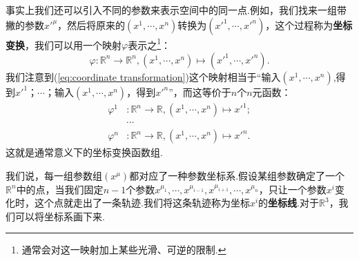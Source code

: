 	事实上我们还可以引入不同的参数来表示空间中的同一点.例如，我们找来一组带撇的参数$x'^\mu$，然后将原来的$(x^1,\cdots,x^n)$转换为$(x'^1,\cdots,x'^n)$，这个过程称为\textbf{坐标变换}，我们可以用一个映射$\varphi$表示之\footnote{通常会对这一映射加上某些光滑、可逆的限制.}：
	\begin{equation}\label{eq:coordinate transformation}
		\varphi:\mathbb{R}^n\rightarrow \mathbb{R}^n,(x^1,\cdots,x^n)\mapsto (x'^1,\cdots,x'^n).
	\end{equation}
	我们注意到(\ref{eq:coordinate transformation})这个映射相当于“输入$(x^1,\cdots,x^n)$,得到$x'^1$；$\cdots$；输入$(x^1,\cdots,x^n)$，得到$x'^n$”，而这等价于$n$个$n$元函数：
	\begin{equation}
		\begin{split}
			\varphi^1&:\mathbb{R}^n\rightarrow \mathbb{R},(x^1,\cdots,x^n)\mapsto x'^1;\\
			&\cdots\\
			\varphi^n&:\mathbb{R}^n\rightarrow \mathbb{R},(x^1,\cdots,x^n)\mapsto x'^n.
		\end{split}
	\end{equation}
	这就是通常意义下的坐标变换函数组.
			
	我们说，每一组参数组$(x^\mu)$都对应了一种参数坐标系.假设某组参数确定了一个$\mathbb{R}^n$中的点，当我们固定$n-1$个参数$x^{\mu_1},\cdots,x^{\mu_{i-1}},x^{\mu_{i+1}},\cdots,x^{\mu_n}$，只让一个参数$x^i$变化时，这个点就走出了一条轨迹.我们将这条轨迹称为坐标$x^i$的\textbf{坐标线}.对于$\mathbb{R}^3$，我们可以将坐标系画下来.

